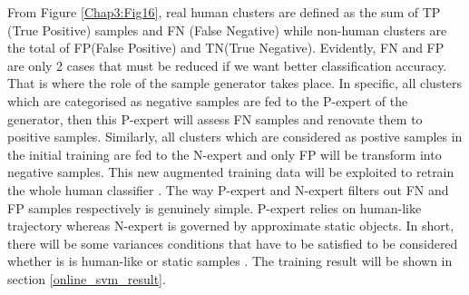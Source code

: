 From Figure \ref{Chap3:Fig16}, real human clusters are defined as the sum of TP (True Positive) samples and
FN (False Negative) while non-human clusters are the total of FP(False Positive) and TN(True Negative). Evidently,
FN and FP are only 2 cases that must be reduced if we want better classification accuracy. That is where the role of
the sample generator takes place. In specific, all clusters which are categorised as negative samples
are fed to the P-expert of the generator, then this P-expert will assess FN samples and renovate them to positive samples.
Similarly, all clusters which are considered as postive samples in the initial training are fed to the
N-expert and only FP will be transform into negative samples.  This new augmented training data will be
exploited to retrain the whole human classifier \cite{online_learning}. The way P-expert and N-expert
filters out FN and FP samples respectively is genuinely simple. P-expert relies on human-like
trajectory whereas N-expert is governed by approximate static objects. In short, there will be some variances conditions
that have to be satisfied to be considered whether is is human-like or static samples \cite{online_learning}. The
training result will be shown in section \ref{online_svm_result}.








